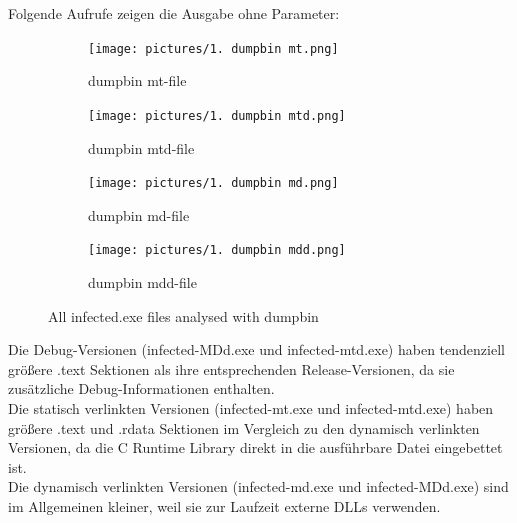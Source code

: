 \documentclass{article}
\begin{document}
	\noindent Folgende Aufrufe zeigen die Ausgabe ohne Parameter:\\
	\begin{figure}[htp]
		\centering
		\begin{subfigure}[b]{0.45\textwidth}
			\texttt{[image: pictures/1. dumpbin mt.png]}
			\caption{dumpbin mt-file}
			\label{fig:image1}
		\end{subfigure}
		\hfill
		\begin{subfigure}[b]{0.45\textwidth}
			\texttt{[image: pictures/1. dumpbin mtd.png]}
			\caption{dumpbin mtd-file}
			\label{fig:image2}
		\end{subfigure}
		
		\vspace{10pt} %
		
		\begin{subfigure}[b]{0.45\textwidth}
			\texttt{[image: pictures/1. dumpbin md.png]}
			\caption{dumpbin md-file}
			\label{fig:image3}
		\end{subfigure}
		\hfill
		\begin{subfigure}[b]{0.45\textwidth}
			\texttt{[image: pictures/1. dumpbin mdd.png]}
			\caption{dumpbin mdd-file}
			\label{fig:image4}
		\end{subfigure}
		\caption{All infected.exe files analysed with dumpbin}
		\label{fig:grid}
	\end{figure}
	
	\noindent Die Debug-Versionen (infected-MDd.exe und infected-mtd.exe) haben tendenziell größere .text Sektionen als ihre entsprechenden Release-Versionen, da sie zusätzliche Debug-Informationen enthalten.\\
	Die statisch verlinkten Versionen (infected-mt.exe und infected-mtd.exe) haben größere .text und .rdata Sektionen im Vergleich zu den dynamisch verlinkten Versionen, da die C Runtime Library direkt in die ausführbare Datei eingebettet ist.\\
	Die dynamisch verlinkten Versionen (infected-md.exe und infected-MDd.exe) sind im Allgemeinen kleiner, weil sie zur Laufzeit externe DLLs verwenden.\\
	
	\pagebreak
	
\end{document}
